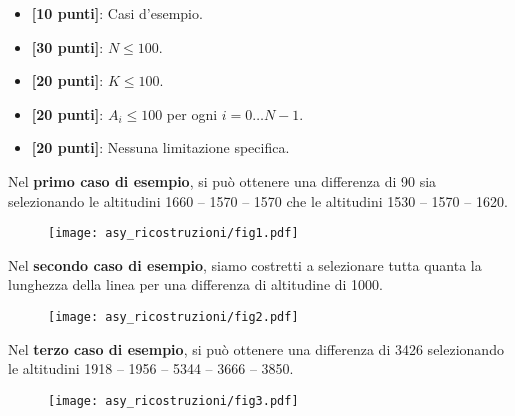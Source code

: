 \begin{itemize}[nolistsep,itemsep=2mm]
  \item \textbf{ [10 punti]}: Casi d'esempio.
  \item \textbf{ [30 punti]}: $N \leq 100$.
  \item \textbf{ [20 punti]}: $K \leq 100$.
  \item \textbf{ [20 punti]}: $A_i \leq 100$ per ogni $i=0 \ldots N-1$.
  \item \textbf{ [20 punti]}: Nessuna limitazione specifica.
\end{itemize}

\Examples
\Examples
\begin{example}
%
%
%
\end{example}


\Explanation
Nel \textbf{primo caso di esempio}, si può ottenere una differenza di 90 sia selezionando le altitudini 1660 -- 1570 -- 1570 che le altitudini 1530 -- 1570 -- 1620.\\[2mm]
\begin{figure}[H]%
\centering\texttt{[image: asy\_ricostruzioni/fig1.pdf]}%
\end{figure}
Nel \textbf{secondo caso di esempio}, siamo costretti a selezionare tutta quanta la lunghezza della linea per una differenza di altitudine di 1000.\\[2mm]
\begin{figure}[H]%
\centering\texttt{[image: asy\_ricostruzioni/fig2.pdf]}%
\end{figure}
Nel \textbf{terzo caso di esempio}, si può ottenere una differenza di 3426 selezionando le altitudini 1918 -- 1956 -- 5344 -- 3666 -- 3850.\\[2mm]
\begin{figure}[H]%
\centering\texttt{[image: asy\_ricostruzioni/fig3.pdf]}%
\end{figure}
